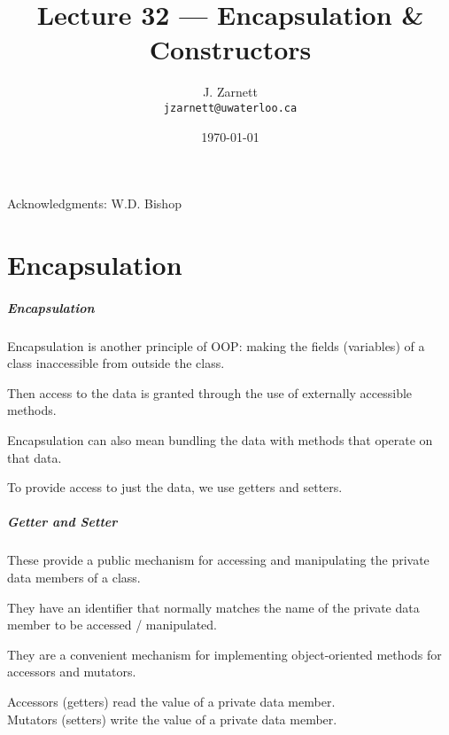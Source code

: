 

\title{Lecture 32 --- Encapsulation \& Constructors}

\author{J. Zarnett\\
\texttt{jzarnett@uwaterloo.ca}}
\date{\today}



\begin{frame}
  \titlepage
  
  \begin{center}
  \small{Acknowledgments: W.D. Bishop}
  \end{center}
\end{frame}

\part{Encapsulation}
\begin{frame}\partpage\end{frame}

\begin{frame}
\frametitle{Encapsulation}
\alert{Encapsulation} is another principle of OOP: making the fields (variables) of a class inaccessible from outside the class.

Then access to the data is granted through the use of externally accessible methods.

Encapsulation can also mean bundling the data with methods that operate on that data.

To provide access to just the data, we use \alert{getter}s and \alert{setter}s.

\end{frame}


\begin{frame}
\frametitle{Getter and Setter}

These provide a public mechanism for accessing and manipulating the private data members of a class.

They have an identifier that normally matches the name of the private data member to be accessed / manipulated.

They are a convenient mechanism for implementing object-oriented methods for accessors and mutators.

\alert{Accessors} (getters) read the value of a private data member.\\
\alert{Mutators} (setters) write the value of a private data member.

\end{frame}

